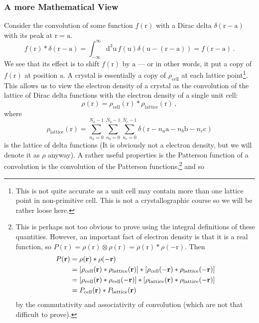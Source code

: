 \documentclass{article}
\theoremstyle{plain}\theoremheaderfont{\normalfont\itshape}\theorembodyfont{\rmfamily}\theoremseparator{.}\newtheorem*{rem}{Remark}\newtheorem*{ex}{Example}\newtheorem*{proof}{Proof}\newtheorem*{altp}{Alternative proof}
\theoremstyle{plain}\theoremheaderfont{\normalfont\bfseries}\theorembodyfont{\rmfamily}\theoremseparator{.}\newtheorem{thm}{Theorem}[section]\newtheorem{lem}[thm]{Lemma}\newtheorem{prop}[thm]{Proposition}\newtheorem*{cor}{Corollary}\newtheorem{defn}[thm]{Definition}\newtheorem{clm}[thm]{Claim}\newtheorem{clminproof}{Claim}\newtheorem*{law}{Law}\newtheorem{pos}[thm]{Postulate}
\theoremstyle{break}\theoremheaderfont{\normalfont\itshape}\theorembodyfont{\rmfamily}\theoremseparator{.\medskip}\newtheorem*{proofskip}{Proof}\newtheorem*{exs}{Examples}\newtheorem*{rems}{Remarks}
\theoremstyle{break}\theoremheaderfont{\normalfont\bfseries}\theorembodyfont{\rmfamily}\theoremseparator{.\medskip}\newtheorem{lemskip}[thm]{Lemma}\newtheorem{defnskip}[thm]{Definition}\newtheorem{propskip}[thm]{Proposition}\newtheorem{thmskip}[thm]{Theorem}
\numberwithin{equation}{section}
\newcommand{\dd}[2][]{\mathrm{d}^{#1} #2\,}
\newcommand{\vb}[1]{\bm{\mathrm{#1}}}
\begin{document}
    \subsubsection*{A more Mathematical View}
    Consider the convolution of some function \(f(\vb{r})\) with a Dirac delta \(\delta(\vb{r}-\vb{a})\) with its peak at \(\vb{r}=\vb{a}\).
    \begin{equation}
        f(\vb{r})*\delta(\vb{r}-\vb{a})=\int_{-\infty}^{\infty}\dd[3]{\vb{u}}f(\vb{u})\delta(\vb{u}-(\vb{r}-\vb{a}))=f(\vb{r}-\vb{a})\,.
    \end{equation}
    We see that its effect is to shift \(f(\vb{r})\) by \(\vb{a}\) --- or in other words, it put a copy of \(f(\vb{r})\) at position \(\vb{a}\). A crystal is essentially a copy of \(\rho_{\text{cell}}\) at each lattice point\footnote{This is not quite accurate as a unit cell may contain more than one lattice point in non-primitive cell. This is not a crystallographic course so we will be rather loose here.}. This allows us to view the electron density of a crystal as the convolution of the lattice of Dirac delta functions with the electron density of a single unit cell:
    \begin{equation}\label{crystal_electron_density_as_convolution}
        \rho(\vb{r})=\rho_{\text{cell}}(\vb{r})*\rho_{\text{lattice}}(\vb{r})\,,
    \end{equation}
    where
    \begin{equation}
        \rho_{\text{lattice}}(\vb{r})=\sum_{n_a=0}^{N_a-1}\sum_{n_b=0}^{N_b-1}\sum_{n_c=0}^{N_c-1}\delta(\vb{r}-n_a\vb{a}-n_b\vb{b}-n_c\vb{c})
    \end{equation}
    is the lattice of delta functions (It is obviously not a electron density, but we will denote it as \(\rho\) anyway). A rather useful properties is the Patterson function of a convolution is the convolution of the Patterson functions,\footnote{This is perhaps not too obvious to prove using the integral definitions of these quantities. However, an important fact of electron density is that it is a real function, so \(P(\vb{r})=\rho(\vb{r})\otimes\rho(\vb{r})=\rho(\vb{r})*\rho(-\vb{r})\). Then
    \begin{align}
        P(\vb{r})&=\rho(\vb{r})*\rho(-\vb{r})\notag \\
        &=[\rho_{\text{cell}}(\vb{r})*\rho_{\text{lattice}}(\vb{r})]*[\rho_{\text{cell}}(-\vb{r})*\rho_{\text{lattice}}(-\vb{r})]\notag \\
        &=[\rho_{\text{cell}}(\vb{r})*\rho_{\text{cell}}(-\vb{r})]*[\rho_{\text{lattice}}(\vb{r})*\rho_{\text{lattice}}(-\vb{r})]\notag \\
        &=P_{\text{cell}}(\vb{r})*P_{\text{lattice}}(\vb{r})
    \end{align}
    by the commutativity and associativity of convolution (which are not that difficult to prove).} and so
\end{document}
